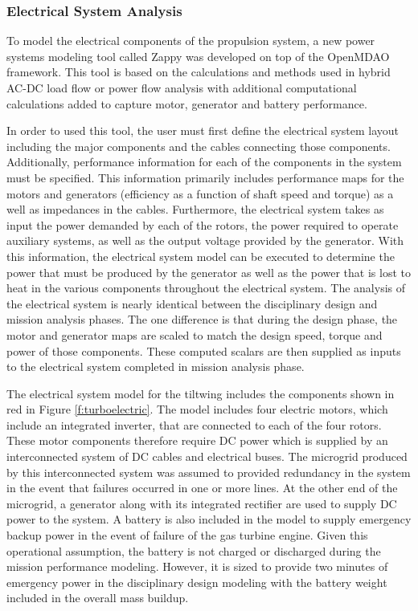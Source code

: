
\subsubsection{Electrical System Analysis} %
To model the electrical components of the propulsion system, a new power systems modeling tool called Zappy was developed on top of the OpenMDAO framework.  
This tool is based on the calculations and methods used in hybrid AC-DC load flow or power flow analysis\cite{hendricks2019load} with additional computational calculations added to capture motor, generator and battery performance. 

In order to used this tool, the user must first define the electrical system layout including the major components and the cables connecting those components.
Additionally, performance information for each of the components in the system must be specified.
This information primarily includes performance maps for the motors and generators (efficiency as a function of shaft speed and torque) as a well as impedances in the cables.
Furthermore, the electrical system takes as input the power demanded by each of the rotors, the power required to operate auxiliary systems, as well as the output voltage provided by the generator.
With this information, the electrical system model can be executed to determine the power that must be produced by the generator as well as the power that is lost to heat in the various components throughout the electrical system.
The analysis of the electrical system is nearly identical between the disciplinary design and mission analysis phases.
The one difference is that during the design phase, the motor and generator maps are scaled to match the design speed, torque and power of those components.  
These computed scalars are then supplied as inputs to the electrical system completed in mission analysis phase. 

The electrical system model for the tiltwing includes the components shown in red in Figure \ref{f:turboelectric}.
The model includes four electric motors, which include an integrated inverter, that are connected to each of the four rotors.
These motor components therefore require DC power which is supplied by an interconnected system of DC cables and electrical buses.
The microgrid produced by this interconnected system was assumed to provided redundancy in the system in the event that failures occurred in one or more lines.
At the other end of the microgrid, a generator along with its integrated rectifier are used to supply DC power to the system.
A battery is also included in the model to supply emergency backup power in the event of failure of the gas turbine engine.
Given this operational assumption, the battery is not charged or discharged during the mission performance modeling.
However, it is sized to provide two minutes of emergency power in the disciplinary design modeling with the battery weight included in the overall mass buildup.


